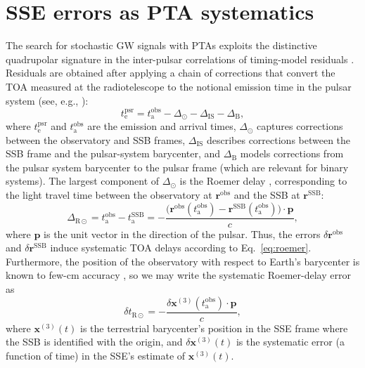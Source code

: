 \documentclass[reprint,
 amsmath,amssymb,
 aps,prd,floatfix,
]{revtex4-1}
\begin{document}
\section{SSE errors as PTA systematics}
\label{sec:systematics}

The search for stochastic GW signals with PTAs exploits the distinctive quadrupolar signature in the inter-pulsar correlations of timing-model residuals \cite{hd83}.
Residuals are obtained after applying a chain of corrections that convert the TOA measured at the radiotelescope to the notional emission time in the pulsar system (see, e.g., \cite{ehm06}):
%
\begin{equation}
    t_\mathrm{e}^\mathrm{psr} = t_\mathrm{a}^\mathrm{obs} - \Delta_\odot - \Delta_\mathrm{IS} - \Delta_\mathrm{B},
\end{equation}
%
where $t_\mathrm{e}^\mathrm{psr}$ and $t_\mathrm{a}^\mathrm{obs}$ are the emission and arrival times, $\Delta_\odot$ captures corrections between the observatory and SSB frames, $\Delta_\mathrm{IS}$ describes corrections between the SSB frame and the pulsar-system barycenter, and $\Delta_\mathrm{B}$ models corrections from the pulsar system barycenter to the pulsar frame (which are relevant for binary systems). The largest component of $\Delta_\odot$ is the Roemer delay \cite{roemer1676}, corresponding to the light travel time between the observatory at $\mathbf{r}^\mathrm{obs}$ and the SSB at $\mathbf{r}^\mathrm{SSB}$:
%
\begin{equation}
\label{eq:roemer}
\Delta_{\mathrm{R}\odot} =
t_\mathrm{a}^\mathrm{obs} - t_\mathrm{a}^\mathrm{SSB} =
-\frac{\bigl(\mathbf{r}^\mathrm{obs}(t_\mathrm{a}^\mathrm{obs}) - \mathbf{r}^\mathrm{SSB}(t_\mathrm{a}^\mathrm{obs})\bigr) \cdot \mathbf{p}}{c},
\end{equation}
%
where $\mathbf{p}$ is the unit vector in the direction of the pulsar. Thus, the errors $\delta \mathbf{r}^\mathrm{obs}$ and $\delta \mathbf{r}^\mathrm{SSB}$ induce systematic TOA delays according to Eq.\ \eqref{eq:roemer}.
Furthermore, the position of the observatory with respect to Earth's barycenter is known to few-cm accuracy \cite{ehm06}, so we may write the systematic Roemer-delay error as
%
\begin{equation}
\label{eq:deltar}
\delta t_{\mathrm{R}\odot} = -\frac{\delta \mathbf{x}^{(3)}(t_\mathrm{a}^\mathrm{obs})\cdot\mathbf{p}}{c},
\end{equation}
%
where $\mathbf{x}^{(3)}(t)$ is the terrestrial barycenter's position in the SSE frame where the SSB is identified with the origin, and $\delta \mathbf{x}^{(3)}(t)$ is the systematic error (a function of time) in the SSE's estimate of $\mathbf{x}^{(3)}(t)$.
\end{document}
